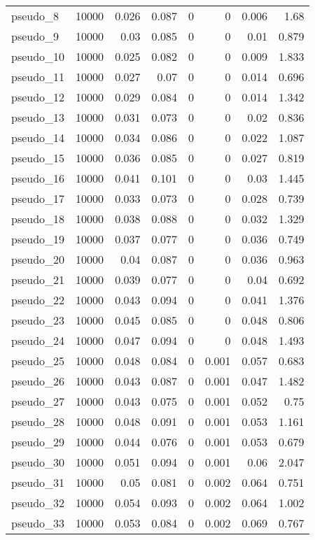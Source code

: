 \begin{table}[!htbp]
{\begin{tabular}{lrrrrrrr}
pseudo\_8 & 10000 & 0.026 & 0.087 & 0 & 0 & 0.006 & 1.68 \\ 
pseudo\_9 & 10000 & 0.03 & 0.085 & 0 & 0 & 0.01 & 0.879 \\ 
pseudo\_10 & 10000 & 0.025 & 0.082 & 0 & 0 & 0.009 & 1.833 \\ 
pseudo\_11 & 10000 & 0.027 & 0.07 & 0 & 0 & 0.014 & 0.696 \\ 
pseudo\_12 & 10000 & 0.029 & 0.084 & 0 & 0 & 0.014 & 1.342 \\ 
pseudo\_13 & 10000 & 0.031 & 0.073 & 0 & 0 & 0.02 & 0.836 \\ 
pseudo\_14 & 10000 & 0.034 & 0.086 & 0 & 0 & 0.022 & 1.087 \\ 
pseudo\_15 & 10000 & 0.036 & 0.085 & 0 & 0 & 0.027 & 0.819 \\ 
pseudo\_16 & 10000 & 0.041 & 0.101 & 0 & 0 & 0.03 & 1.445 \\ 
pseudo\_17 & 10000 & 0.033 & 0.073 & 0 & 0 & 0.028 & 0.739 \\ 
pseudo\_18 & 10000 & 0.038 & 0.088 & 0 & 0 & 0.032 & 1.329 \\ 
pseudo\_19 & 10000 & 0.037 & 0.077 & 0 & 0 & 0.036 & 0.749 \\ 
pseudo\_20 & 10000 & 0.04 & 0.087 & 0 & 0 & 0.036 & 0.963 \\ 
pseudo\_21 & 10000 & 0.039 & 0.077 & 0 & 0 & 0.04 & 0.692 \\ 
pseudo\_22 & 10000 & 0.043 & 0.094 & 0 & 0 & 0.041 & 1.376 \\ 
pseudo\_23 & 10000 & 0.045 & 0.085 & 0 & 0 & 0.048 & 0.806 \\ 
pseudo\_24 & 10000 & 0.047 & 0.094 & 0 & 0 & 0.048 & 1.493 \\ 
pseudo\_25 & 10000 & 0.048 & 0.084 & 0 & 0.001 & 0.057 & 0.683 \\ 
pseudo\_26 & 10000 & 0.043 & 0.087 & 0 & 0.001 & 0.047 & 1.482 \\ 
pseudo\_27 & 10000 & 0.043 & 0.075 & 0 & 0.001 & 0.052 & 0.75 \\ 
pseudo\_28 & 10000 & 0.048 & 0.091 & 0 & 0.001 & 0.053 & 1.161 \\ 
pseudo\_29 & 10000 & 0.044 & 0.076 & 0 & 0.001 & 0.053 & 0.679 \\ 
pseudo\_30 & 10000 & 0.051 & 0.094 & 0 & 0.001 & 0.06 & 2.047 \\ 
pseudo\_31 & 10000 & 0.05 & 0.081 & 0 & 0.002 & 0.064 & 0.751 \\ 
pseudo\_32 & 10000 & 0.054 & 0.093 & 0 & 0.002 & 0.064 & 1.002 \\ 
pseudo\_33 & 10000 & 0.053 & 0.084 & 0 & 0.002 & 0.069 & 0.767 \\ 

\end{tabular}}
\end{table}
